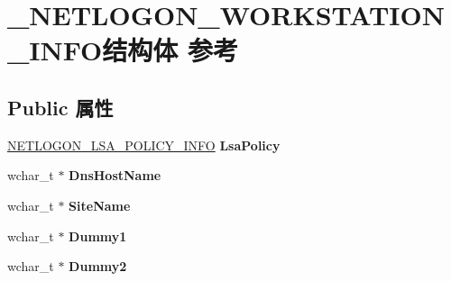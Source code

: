 \hypertarget{struct___n_e_t_l_o_g_o_n___w_o_r_k_s_t_a_t_i_o_n___i_n_f_o}{}\section{\+\_\+\+N\+E\+T\+L\+O\+G\+O\+N\+\_\+\+W\+O\+R\+K\+S\+T\+A\+T\+I\+O\+N\+\_\+\+I\+N\+F\+O结构体 参考}
\label{struct___n_e_t_l_o_g_o_n___w_o_r_k_s_t_a_t_i_o_n___i_n_f_o}
\subsection*{Public 属性}
\begin{DoxyCompactItemize}
\item 
\mbox{\label{struct___n_e_t_l_o_g_o_n___w_o_r_k_s_t_a_t_i_o_n___i_n_f_o_a30835bd0fcc0b3def30bba1295fa7944}} 
\hyperlink{struct___n_e_t_l_o_g_o_n___l_s_a___p_o_l_i_c_y___i_n_f_o}{N\+E\+T\+L\+O\+G\+O\+N\+\_\+\+L\+S\+A\+\_\+\+P\+O\+L\+I\+C\+Y\+\_\+\+I\+N\+FO} {\bfseries Lsa\+Policy}
\item 
\mbox{\label{struct___n_e_t_l_o_g_o_n___w_o_r_k_s_t_a_t_i_o_n___i_n_f_o_a4b4def5b2a07c5129384c4b60d10eb3a}} 
wchar\+\_\+t $\ast$ {\bfseries Dns\+Host\+Name}
\item 
\mbox{\label{struct___n_e_t_l_o_g_o_n___w_o_r_k_s_t_a_t_i_o_n___i_n_f_o_a50166e348f4a23d0b5a6a3a0e255446d}} 
wchar\+\_\+t $\ast$ {\bfseries Site\+Name}
\item 
\mbox{\label{struct___n_e_t_l_o_g_o_n___w_o_r_k_s_t_a_t_i_o_n___i_n_f_o_a704effa268114aa1cc6ca52a294e5aa8}} 
wchar\+\_\+t $\ast$ {\bfseries Dummy1}
\item 
\mbox{\label{struct___n_e_t_l_o_g_o_n___w_o_r_k_s_t_a_t_i_o_n___i_n_f_o_a5e95f52223c300f9f791380f7dc11f58}} 
wchar\+\_\+t $\ast$ {\bfseries Dummy2}
\item 
\mbox{\label{struct___n_e_t_l_o_g_o_n___w_o_r_k_s_t_a_t_i_o_n___i_n_f_o_a821833f51975383b16cae558d0832381}} 

\end{DoxyCompactItemize}
